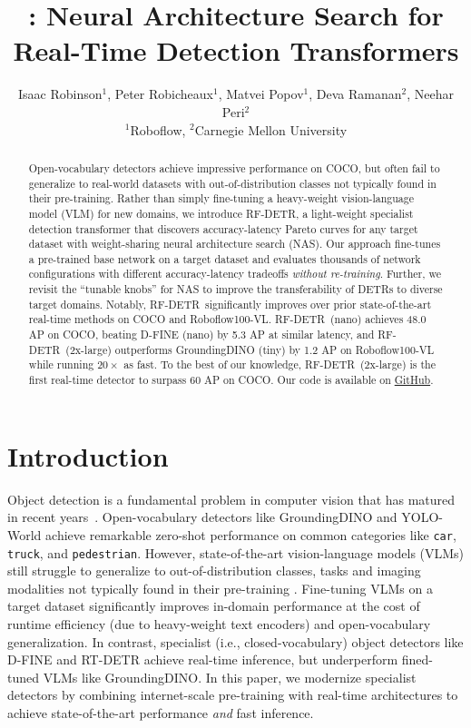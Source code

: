 \documentclass{article} %
\title{\method: Neural Architecture Search for Real-Time Detection Transformers}
\author{Isaac Robinson$^{1}$, Peter Robicheaux$^{1}$, Matvei Popov$^1$, Deva Ramanan$^{2}$, Neehar Peri$^{2}$ \\
$^1$Roboflow, $^2$Carnegie Mellon University\\
}
\newcommand{\method}{RF-DETR}
\begin{document}
\maketitle

\begin{abstract}
Open-vocabulary detectors achieve impressive performance on COCO, but often fail to generalize to real-world datasets with out-of-distribution classes not typically found in their pre-training. Rather than simply fine-tuning a heavy-weight vision-language model (VLM) for new domains, we introduce \method, a light-weight specialist detection transformer that discovers accuracy-latency Pareto curves for any target dataset with weight-sharing neural architecture search (NAS). Our approach fine-tunes a pre-trained base network on a target dataset and evaluates thousands of network configurations with different accuracy-latency tradeoffs \textit{without re-training}. Further, we revisit the ``tunable knobs'' for NAS to improve the transferability of DETRs to diverse target domains. Notably, \method \ significantly improves over prior state-of-the-art real-time methods on COCO and Roboflow100-VL. \method \ (nano) achieves 48.0 AP on COCO, beating D-FINE (nano) by 5.3 AP at similar latency, and \method \ (2x-large) outperforms GroundingDINO (tiny) by 1.2 AP on Roboflow100-VL while running $20 \times$ as fast. To the best of our knowledge, \method \ (2x-large) is the first real-time detector to surpass 60 AP on COCO. Our code is available on \href{https://github.com/roboflow/rf-detr}{GitHub}.
\end{abstract}

\section{Introduction}
Object detection is a fundamental problem in computer vision that has matured in recent years~\citep{felzenszwalb2009object, lin2014coco, ren2015faster}. Open-vocabulary detectors like GroundingDINO \citep{liu2023grounding} and YOLO-World \citep{Cheng2024YOLOWorld} achieve remarkable zero-shot performance on common categories like {\tt car}, {\tt truck}, and {\tt pedestrian}. However, state-of-the-art vision-language models (VLMs) still struggle to generalize to out-of-distribution classes, tasks and imaging modalities not typically found in their pre-training \citep{robicheaux2025roboflow100vl}. Fine-tuning VLMs on a target dataset significantly improves in-domain performance at the cost of runtime efficiency (due to heavy-weight text encoders) and open-vocabulary generalization. In contrast, specialist (i.e., closed-vocabulary) object detectors like D-FINE \citep{peng2024dfine} and RT-DETR \citep{zhao2024rtdetr} achieve real-time inference, but underperform fined-tuned VLMs like GroundingDINO. In this paper, we modernize specialist detectors by combining internet-scale pre-training with real-time architectures to achieve state-of-the-art performance {\em and} fast inference. 
\end{document}
